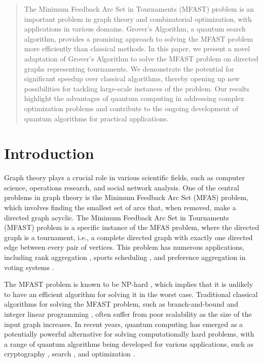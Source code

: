 \begin{abstract}
The Minimum Feedback Arc Set in Tournaments (MFAST) problem is an important problem in graph theory and combinatorial optimization, with applications in various domains. Grover's Algorithm, a quantum search algorithm, provides a promising approach to solving the MFAST problem more efficiently than classical methods. In this paper, we present a novel adaptation of Grover's Algorithm to solve the MFAST problem on directed graphs representing tournaments. We demonstrate the potential for significant speedup over classical algorithms, thereby opening up new possibilities for tackling large-scale instances of the problem. Our results highlight the advantages of quantum computing in addressing complex optimization problems and contribute to the ongoing development of quantum algorithms for practical applications.
\end{abstract}

\section{Introduction}

Graph theory plays a crucial role in various scientific fields, such as computer science, operations research, and social network analysis. One of the central problems in graph theory is the Minimum Feedback Arc Set (MFAS) problem, which involves finding the smallest set of arcs that, when removed, make a directed graph acyclic. The Minimum Feedback Arc Set in Tournaments (MFAST) problem is a specific instance of the MFAS problem, where the directed graph is a tournament, i.e., a complete directed graph with exactly one directed edge between every pair of vertices. This problem has numerous applications, including rank aggregation \cite{dwork2001rank}, sports scheduling \cite{wright1991scheduling}, and preference aggregation in voting systems \cite{fishburn1977condorcet}.

The MFAST problem is known to be NP-hard \cite{aittai1982feedback}, which implies that it is unlikely to have an efficient algorithm for solving it in the worst case. Traditional classical algorithms for solving the MFAST problem, such as branch-and-bound \cite{puppe1999integer} and integer linear programming \cite{garey1979computers}, often suffer from poor scalability as the size of the input graph increases. In recent years, quantum computing has emerged as a potentially powerful alternative for solving computationally hard problems, with a range of quantum algorithms being developed for various applications, such as cryptography \cite{shor1999polynomial}, search \cite{grover1996fast}, and optimization \cite{farhi2014quantum}.

